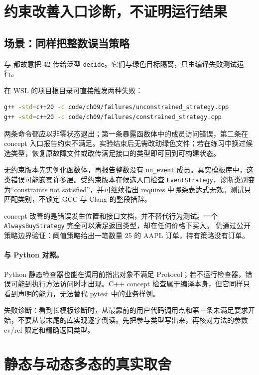 \section{约束改善入口诊断，不证明运行结果}

\subsection{场景：同样把整数误当策略}

 与  都故意把 42 传给泛型 \texttt{decide}。它们与绿色目标隔离，只由编译失败测试运行。

在 WSL 的项目根目录可直接触发两种失败：

\begin{lstlisting}[language=bash]
g++ -std=c++20 -c code/ch09/failures/unconstrained_strategy.cpp
g++ -std=c++20 -c code/ch09/failures/constrained_strategy.cpp
\end{lstlisting}

两条命令都应以非零状态退出；第一条暴露函数体中的成员访问错误，第二条在 concept 入口报告约束不满足。实验结束后无需改动绿色文件；若在练习中换过候选类型，恢复原故障文件或改传满足接口的类型即可回到可构建状态。

无约束版本先实例化函数体，再报告整数没有 \texttt{on\_event} 成员。真实模板库中，这类错误可能嵌套许多层。受约束版本在候选入口检查 \texttt{EventStrategy}，诊断类别变为“constraints not satisfied”，并可继续指出 requires 中哪条表达式无效。测试只匹配类别，不锁定 GCC 与 Clang 的整段措辞。

concept 改善的是错误发生位置和接口文档，并不替代行为测试。一个 \texttt{AlwaysBuyStrategy} 完全可以满足返回类型，却在任何价格下买入。 仍通过公开策略边界验证：阈值策略给出一笔数量 25 的 AAPL 订单，持有策略没有订单。

\paragraph{与 Python 对照。}
Python 静态检查器也能在调用前指出对象不满足 Protocol；若不运行检查器，错误可能到执行方法访问时才出现。C++ concept 检查属于编译本身，但它同样只看到声明的能力，无法替代 pytest 中的业务样例。

失败诊断：看到长模板诊断时，从最靠前的用户代码调用点和第一条未满足要求开始，不要从最末尾的库实现逐字倒读。先把参与类型写出来，再核对方法的参数 cv/ref 限定和精确返回类型。

\section{静态与动态多态的真实取舍}

